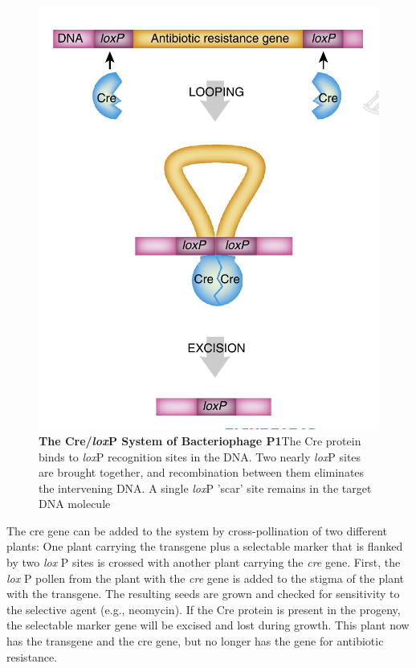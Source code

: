 \documentclass[nofonts,]{tufte-handout}
\begin{document}
\begin{figure}
\includegraphics[width=0.9\linewidth]{./images/marker_removal} \caption{\textbf{The Cre/\textit{lox}P System of Bacteriophage P1}\newline The Cre protein binds to \textit{lox}P recognition sites in the DNA. Two nearly \textit{lox}P sites are brought together, and recombination between them eliminates the intervening DNA. A single \textit{lox}P 'scar' site remains in the target DNA molecule}\label{fig:marker-removal}
\end{figure}

The cre gene can be added to the system by cross-pollination of two
different plants: One plant carrying the transgene plus a selectable
marker that is flanked by two \emph{lox} P sites is crossed with another
plant carrying the \emph{cre} gene. First, the \emph{lox} P pollen from
the plant with the \emph{cre} gene is added to the stigma of the plant
with the transgene. The resulting seeds are grown and checked for
sensitivity to the selective agent (e.g., neomycin). If the Cre protein
is present in the progeny, the selectable marker gene will be excised
and lost during growth. This plant now has the transgene and the cre
gene, but no longer has the gene for antibiotic resistance.
\end{document}
